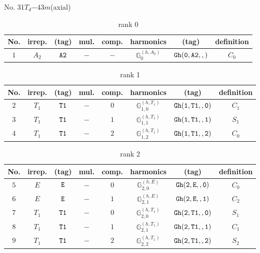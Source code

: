 \documentclass[fleqn,8pt]{jsarticle}
\begin{document}
\setcounter{MaxMatrixCols}{16}

\begin{center}
\LARGE
No. 31\quad$T_{d}$\quad$-43m$\quad[ cubic ] (axial)
\end{center}
\begin{table}[ht!]
\begin{center}
\caption{rank 0}
\renewcommand{\arraystretch}{1.3}
\begin{tabular}{cccccccc} \hline \hline
No. & irrep. & (tag) & mul. & comp. & harmonics & (tag) & definition \\ \hline
$ 1 $ & $ A_{2} $ & $ {\tt A2} $ & $ - $ & $ - $ & $ \mathbb{G}_{0}^{(h,A_{2})} $ & $ {\tt Gh(0,A2,,)} $ & $ C_{0} $ \\
 \hline \hline
\end{tabular}
\end{center}
\end{table}
\begin{table}[ht!]
\begin{center}
\caption{rank 1}
\renewcommand{\arraystretch}{1.3}
\begin{tabular}{cccccccc} \hline \hline
No. & irrep. & (tag) & mul. & comp. & harmonics & (tag) & definition \\ \hline
$ 2 $ & $ T_{1} $ & $ {\tt T1} $ & $ - $ & $ 0 $ & $ \mathbb{G}_{1,0}^{(h,T_{1})} $ & $ {\tt Gh(1,T1,,0)} $ & $ C_{1} $ \\
$ 3 $ & $ T_{1} $ & $ {\tt T1} $ & $ - $ & $ 1 $ & $ \mathbb{G}_{1,1}^{(h,T_{1})} $ & $ {\tt Gh(1,T1,,1)} $ & $ S_{1} $ \\
$ 4 $ & $ T_{1} $ & $ {\tt T1} $ & $ - $ & $ 2 $ & $ \mathbb{G}_{1,2}^{(h,T_{1})} $ & $ {\tt Gh(1,T1,,2)} $ & $ C_{0} $ \\
 \hline \hline
\end{tabular}
\end{center}
\end{table}
\begin{table}[ht!]
\begin{center}
\caption{rank 2}
\renewcommand{\arraystretch}{1.3}
\begin{tabular}{cccccccc} \hline \hline
No. & irrep. & (tag) & mul. & comp. & harmonics & (tag) & definition \\ \hline
$ 5 $ & $ E $ & $ {\tt E} $ & $ - $ & $ 0 $ & $ \mathbb{G}_{2,0}^{(h,E)} $ & $ {\tt Gh(2,E,,0)} $ & $ C_{0} $ \\
$ 6 $ & $ E $ & $ {\tt E} $ & $ - $ & $ 1 $ & $ \mathbb{G}_{2,1}^{(h,E)} $ & $ {\tt Gh(2,E,,1)} $ & $ C_{2} $ \\
$ 7 $ & $ T_{1} $ & $ {\tt T1} $ & $ - $ & $ 0 $ & $ \mathbb{G}_{2,0}^{(h,T_{1})} $ & $ {\tt Gh(2,T1,,0)} $ & $ S_{1} $ \\
$ 8 $ & $ T_{1} $ & $ {\tt T1} $ & $ - $ & $ 1 $ & $ \mathbb{G}_{2,1}^{(h,T_{1})} $ & $ {\tt Gh(2,T1,,1)} $ & $ C_{1} $ \\
$ 9 $ & $ T_{1} $ & $ {\tt T1} $ & $ - $ & $ 2 $ & $ \mathbb{G}_{2,2}^{(h,T_{1})} $ & $ {\tt Gh(2,T1,,2)} $ & $ S_{2} $ \\
 \hline \hline
\end{tabular}
\end{center}
\end{table}
\end{document}
